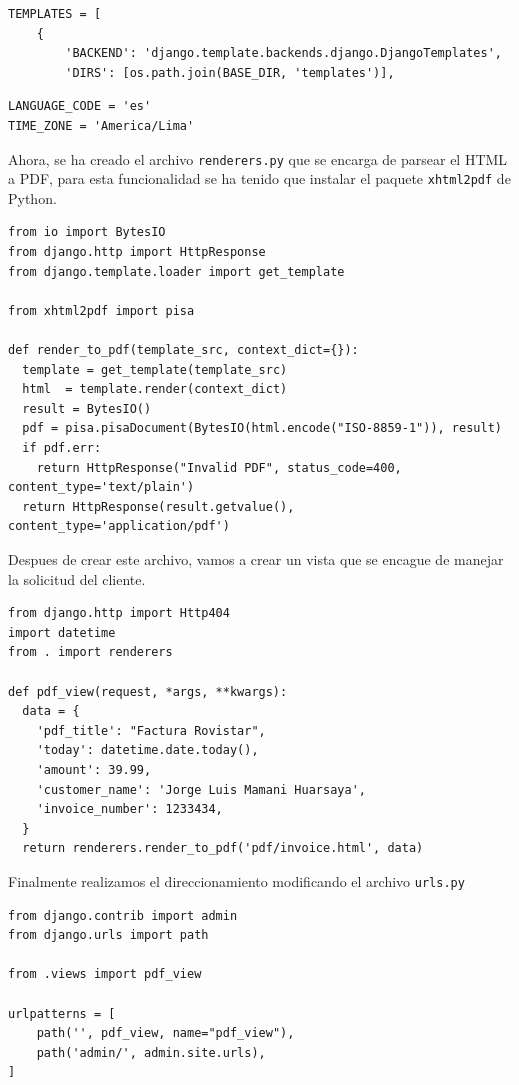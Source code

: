 \documentclass[10pt, a4paper]{article}
\newcommand{\mpy}[1]{\texttt{#1}}
\begin{document}
\begin{verbatim}
TEMPLATES = [
    {
        'BACKEND': 'django.template.backends.django.DjangoTemplates',
        'DIRS': [os.path.join(BASE_DIR, 'templates')],
\end{verbatim}

\begin{verbatim}
LANGUAGE_CODE = 'es'
TIME_ZONE = 'America/Lima'
\end{verbatim}

Ahora, se ha creado el archivo \mpy{renderers.py} que se encarga de parsear el HTML a PDF, para esta funcionalidad se ha tenido que instalar el paquete \mpy{xhtml2pdf} de Python.

\begin{verbatim}
from io import BytesIO
from django.http import HttpResponse
from django.template.loader import get_template

from xhtml2pdf import pisa

def render_to_pdf(template_src, context_dict={}):
  template = get_template(template_src)
  html  = template.render(context_dict)
  result = BytesIO()
  pdf = pisa.pisaDocument(BytesIO(html.encode("ISO-8859-1")), result)
  if pdf.err:
    return HttpResponse("Invalid PDF", status_code=400, content_type='text/plain')
  return HttpResponse(result.getvalue(), content_type='application/pdf')
\end{verbatim}

Despues de crear este archivo, vamos a crear un vista que se encague de manejar la solicitud del cliente.

\begin{verbatim}
from django.http import Http404
import datetime
from . import renderers

def pdf_view(request, *args, **kwargs):
  data = {
    'pdf_title': "Factura Rovistar",
    'today': datetime.date.today(), 
    'amount': 39.99,
    'customer_name': 'Jorge Luis Mamani Huarsaya',
    'invoice_number': 1233434,
  }
  return renderers.render_to_pdf('pdf/invoice.html', data)
\end{verbatim}

Finalmente realizamos el direccionamiento modificando el archivo \mpy{urls.py}

\begin{verbatim}
from django.contrib import admin
from django.urls import path

from .views import pdf_view

urlpatterns = [
    path('', pdf_view, name="pdf_view"),
    path('admin/', admin.site.urls),
]
\end{verbatim}
\end{document}
